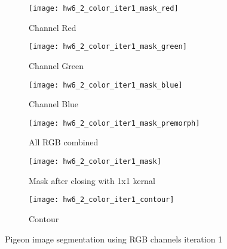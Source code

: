 \documentclass[11pt]{article}
\begin{document}
\begin{figure}[H]
\begin{subfigure}{.5\textwidth}
  \centering
  \texttt{[image: hw6\_2\_color\_iter1\_mask\_red]}
  \caption{Channel Red}
  \label{}
\end{subfigure}
\begin{subfigure}{.5\textwidth}
  \centering
  \texttt{[image: hw6\_2\_color\_iter1\_mask\_green]}
  \caption{Channel Green}
  \label{}
\end{subfigure}

\begin{subfigure}{.5\textwidth}
  \centering
  \texttt{[image: hw6\_2\_color\_iter1\_mask\_blue]}
  \caption{Channel Blue}
  \label{}
\end{subfigure}
\begin{subfigure}{.5\textwidth}
  \centering
  \texttt{[image: hw6\_2\_color\_iter1\_mask\_premorph]}
  \caption{All RGB combined}
  \label{}
\end{subfigure}

\begin{subfigure}{.5\textwidth}
  \centering
  \texttt{[image: hw6\_2\_color\_iter1\_mask]}
  \caption{Mask after closing with 1x1 kernal}
  \label{}
\end{subfigure}
\begin{subfigure}{.5\textwidth}
  \centering
  \texttt{[image: hw6\_2\_color\_iter1\_contour]}
  \caption{Contour}
  \label{}
\end{subfigure}

\caption{Pigeon image segmentation using RGB channels iteration 1}
\label{}
\end{figure}
\end{document}
